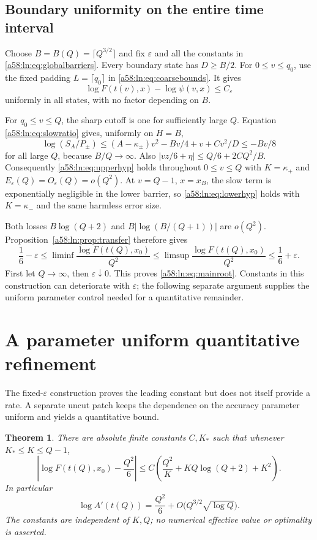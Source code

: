 \documentclass[11pt,letterpaper]{article}
\newtheorem{theorem}{Theorem}[section]
\theoremstyle{remark}
\begin{document}
\subsection{Boundary uniformity on the entire time interval}
Choose $B=B(Q)=\lceil Q^{3/2}\rceil$ and fix $\varepsilon$ and all the
constants in \eqref{a58:ln:eq:globalbarriers}. Every boundary state has $D\ge B/2$.
For $0\le v\le q_0$, use the fixed padding $L=\lceil q_0\rceil$ in
\eqref{a58:ln:eq:coarsebounds}. It gives
\[
 \log F(t(v),x)-\log\psi(v,x)\le C_\varepsilon
\]
uniformly in all states, with no factor depending on $B$.

For $q_0\le v\le Q$, the sharp cutoff is one for sufficiently large
$Q$. Equation \eqref{a58:ln:eq:slowratio} gives, uniformly on $H=B$,
\[
 \log(S_A/P_\pm)
 \le(A-\kappa_\pm)v^2-Bv/4+v+Cv^2/D\le-Bv/8
\]
for all large $Q$, because $B/Q\to\infty$. Also
$|vz/6+\eta|\le Q/6+2CQ^2/B$. Consequently
\eqref{a58:ln:eq:upperhyp} holds throughout $0\le v\le Q$ with
$K=\kappa_+$ and $E_\varepsilon(Q)=O_\varepsilon(Q)=o(Q^2)$.
At $v=Q-1$, $x=x_B$, the slow term is exponentially negligible in
the lower barrier, so \eqref{a58:ln:eq:lowerhyp} holds with
$K=\kappa_-$ and the same harmless error size.

Both losses $B\log(Q+2)$ and $B|\log(B/(Q+1))|$ are $o(Q^2)$.
Proposition~\ref{a58:ln:prop:transfer} therefore gives
\[
 \frac16-\varepsilon\le
 \liminf\frac{\log F(t(Q),x_0)}{Q^2}
 \le\limsup\frac{\log F(t(Q),x_0)}{Q^2}
 \le\frac16+\varepsilon.
\]
First let $Q\to\infty$, then $\varepsilon\downarrow0$. This proves
\eqref{a58:ln:eq:mainroot}. Constants in this construction can deteriorate with $\varepsilon$;
the following separate argument supplies the uniform parameter control
needed for a quantitative remainder.

\section{A parameter uniform quantitative refinement}\label{a58:ln:sec:quantitative}
The fixed-$\varepsilon$ construction proves the leading constant but does
not itself provide a rate. A separate uncut patch keeps the dependence
on the accuracy parameter uniform and yields a quantitative bound.

\begin{theorem}\label{a58:ln:thm:quantitative}
There are absolute finite constants $C,K_*$ such that whenever
$K_*\le K\le Q-1$,
\begin{equation}\label{a58:ln:eq:parameterbound}
 \left|\log F(t(Q),x_0)-\frac{Q^2}{6}\right|
 \le C\left(\frac{Q^2}K+KQ\log(Q+2)+K^2\right).
\end{equation}
In particular
\begin{equation}\label{a58:ln:eq:quantroot}
 \log A'(t(Q))=\frac{Q^2}{6}
                    +O\bigl(Q^{3/2}\sqrt{\log Q}\bigr).
\end{equation}
The constants are independent of $K,Q$; no numerical effective value or
optimality is asserted.
\end{theorem}
\end{document}
